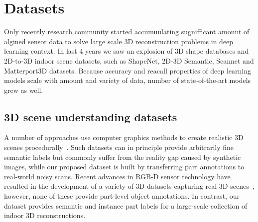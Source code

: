 \section{Datasets}

Only recently research community started accumuulating sugnifficant amount of algined sensor data to solve large scale 3D reconstruction problems in deep learning context. In last 4 years we saw an explosion of 3D shape databases and 2D-to-3D indoor scene datasets, such as ShapeNet, 2D-3D Semantic, Scannet and Matterport3D datasets. Because accuracy and reacall properties of deep learning models scale with amount and variety of data, number of state-of-the-art models grew as well.

\subsection{3D scene understanding datasets}
\label{related:datasets}


A number of approaches use computer graphics methods to create realistic 3D scenes procedurally~\cite{2012-scenesynth,handa2016understanding,song2016ssc,McCormac:etal:ICCV2017,InteriorNet18,garcia2018robotrix}.
Such datasets can in principle provide arbitrarily fine semantic labels but commonly suffer from the reality gap caused by synthetic images, while our proposed dataset is built by transferring part annotations to real-world noisy scans.
Recent advances in RGB-D sensor technology have resulted in the development of a variety of 3D datasets capturing real 3D scenes~\cite{armeni20163d,hua2016scenenn,dai2017scannet,chang2017matterport3d,2017arXiv170201105A,replica19arxiv}, however, none of these provide part-level object annotations.
In contrast, our dataset provides semantic and instance part labels for a large-scale collection of indoor 3D reconstructions.

